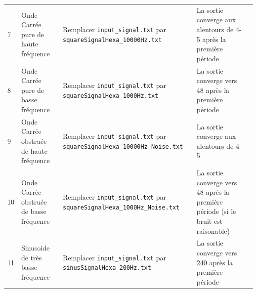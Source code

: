 \documentclass[a11paper]{article}
\newcommand{\cbox}[1][\relax]{\bgroup\setlength{\fboxsep}{4pt}\setlength{\fboxrule}{0.5pt}\fbox{}\egroup}
\begin{document}
\begin{table}[H]
\begin{tabular}{llp{4.7cm}p{3cm}l}
    7 & Onde Carrée pure de haute fréquence &
      Remplacer \Verb#input_signal.txt# par \Verb#squareSignalHexa_10000Hz.txt# &
      La sortie converge aux alentours de 4-5 après la première période\footnotemark[1] \\

    8 & Onde Carrée pure de basse fréquence &
		  Remplacer \Verb#input_signal.txt# par \Verb#squareSignalHexa_1000Hz.txt# &
      La sortie converge vers 48 après la première période\footnotemark[2]   & \cbox[name = lf_square_pure]{ } \\

    9 & Onde Carrée obstruée de haute fréquence &
      Remplacer \Verb#input_signal.txt# par \Verb#squareSignalHexa_10000Hz_Noise.txt# &
      La sortie converge aux alentours de 4-5\footnotemark[3] & \cbox[name = hf_square_noise]{ } \\

    10 & Onde Carrée obstruée de basse fréquence &
		  Remplacer \Verb#input_signal.txt# par \Verb#squareSignalHexa_1000Hz_Noise.txt# &
      La sortie converge vers 48 après la première  période (si le bruit est raisonable)&
      \cbox[name = lf_square_noise]{ } \\

    11 & Sinusoide de très basse fréquence &
		  Remplacer \Verb#input_signal.txt# par \Verb#sinusSignalHexa_200Hz.txt# &
      La sortie converge vers 240 après la première période\footnotemark[4]   & \cbox[name = lf_square_pure]{ } \\

    \bottomrule
  \end{tabular}
\end{table}

\end{document}

